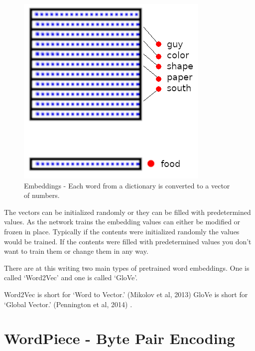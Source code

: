 \begin{figure}[H]
	\begin{center}
	\includegraphics[scale=0.5]{diagram-embedding}
	
	
\end{center}
	\caption[Word Embeddings]{Embeddings - Each word from a dictionary is converted to a vector of numbers.}
	
\end{figure}

The vectors can be initialized randomly or they can be filled with predetermined values. As the network trains the embedding values can either be modified or frozen in place. Typically if the contents were initialized randomly the values would be trained. If the contents were filled with predetermined values you don\textquoteright t want to train them or change them in any way. 

There are at this writing two main types of pretrained word embeddings. One is called \textquoteleft Word2Vec\textquoteright{} and one is called \textquoteleft GloVe\textquoteright . 

Word2Vec is short for \textquoteleft Word to Vector.\textquoteright{} (Mikolov et al, 2013)\cite{mikolov2013efficient} GloVe is short for \textquoteleft Global Vector.\textquoteright{} (Pennington et al, 2014)\cite{pennington-etal-2014-glove} .
\fi

\iffalse
\section{WordPiece - Byte Pair Encoding}

